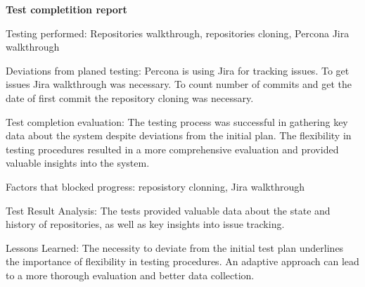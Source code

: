 \textbf{Test completition report}

Testing performed: Repositories walkthrough, repositories cloning, Percona Jira walkthrough

Deviations from planed testing: Percona is using Jira for tracking issues. To get issues Jira walkthrough was necessary. To count number of commits and get the date of first commit the repository cloning was necessary.

Test completion evaluation: The testing process was successful in gathering key data about the system despite deviations from the initial plan. The flexibility in testing procedures resulted in a more comprehensive evaluation and provided valuable insights into the system.

Factors that blocked progress: reposistory clonning, Jira walkthrough

Test Result Analysis: The tests provided valuable data about the state and history of repositories, as well as key insights into issue tracking.

Lessons Learned: The necessity to deviate from the initial test plan underlines the importance of flexibility in testing procedures. An adaptive approach can lead to a more thorough evaluation and better data collection.




